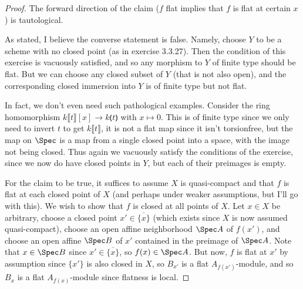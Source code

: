 \begin{proof}
	The forward direction of the claim ($f$ flat implies that $f$ is flat at certain $x$) is tautological.
	
	As stated, I believe the converse statement is false. Namely, choose $Y$ to be a scheme with no closed point (as in exercise 3.3.27). Then the condition of this exercise is vacuously satisfied, and so any morphism to $Y$ of finite type should be flat. But we can choose any closed subset of $Y$ (that is not also open), and the corresponding closed immersion into $Y$ is of finite type but not flat.
	
	In fact, we don't even need such pathological examples. Consider the ring homomorphism $k\lBrack t \rBrack [x] \to k \lParen t \rParen$ with $x \mapsto 0$. This is of finite type since we only need to invert $t$ to get $k \lBrack t \rBrack$, it is not a flat map since it isn't torsionfree, but the map on $\Spec$ is a map from a single closed point into a space, with the image not being closed. Thus again we vacuously satisfy the conditions of the exercise, since we now do have closed points in $Y$, but each of their preimages is empty.
	
	For the claim to be true, it suffices to assume $X$ is quasi-compact and that $f$ is flat at each closed point of $X$ (and perhaps under weaker assumptions, but I'll go with this). We wish to show that $f$ is closed at all points of $X$. Let $x \in X$ be arbitrary, choose a closed point $x' \in \overline{\{x\}}$ (which exists since $X$ is now assumed quasi-compact), choose an open affine neighborhood $\Spec A$ of $f(x')$, and choose an open affine $\Spec B$ of $x'$ contained in the preimage of $\Spec A$. Note that $x \in \Spec B$ since $x' \in \overline{\{x\}}$, so $f(x) \in \Spec A$. But now, $f$ is flat at $x'$ by assumption since $\{x'\}$ is also closed in $X$, so $B_{x'}$ is a flat $A_{f(x')}$-module, and so $B_x$ is a flat $A_{f(x)}$-module since flatness is local.
\end{proof}
